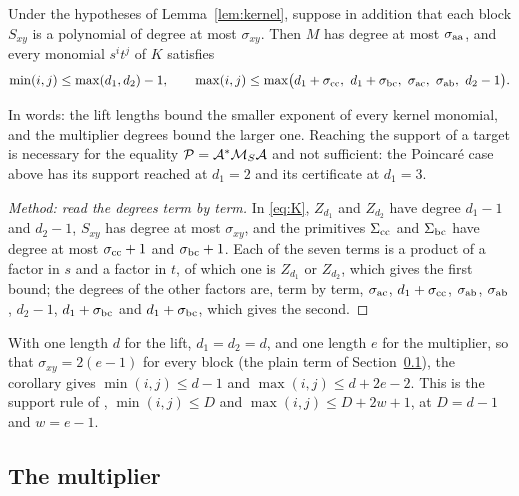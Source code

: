\begin{corollary}\label{cor:support}
Under the hypotheses of Lemma~\ref{lem:kernel}, suppose in addition that each block $S_{xy}$ is a polynomial of degree at most $\sigma_{xy}$. Then $M$ has degree at most $\sigma_{\mathrm{a}\mathrm{a}}$, and every monomial $s^it^j$ of $K$ satisfies
\[
\min(i,j)\le\max(d_1,d_2)-1,\qquad \max(i,j)\le\max\bigl(d_1+\sigma_{\bc\bc},\ d_1+\sigma_{\bb\bc},\ \sigma_{\ba\bc},\ \sigma_{\ba\bb},\ d_2-1\bigr).
\]
\end{corollary}
In words: the lift lengths bound the smaller exponent of every kernel monomial, and the multiplier degrees bound the larger one. Reaching the support of a target is necessary for the equality $\mathcal{P}=\mathcal{A}^*\mathcal{M}_S\mathcal{A}$ and not sufficient: the Poincar\'e case above has its support reached at $d_1=2$ and its certificate at $d_1=3$.

\begin{proof}[Method: read the degrees term by term]
In \eqref{eq:K}, $Z_{d_1}$ and $Z_{d_2}$ have degree $d_1-1$ and $d_2-1$, $S_{xy}$ has degree at most $\sigma_{xy}$, and the primitives $\Sigma_{\mathrm{c}\mathrm{c}}$ and $\Sigma_{\mathrm{b}\mathrm{c}}$ have degree at most $\sigma_{\mathrm{c}\mathrm{c}}+1$ and $\sigma_{\mathrm{b}\mathrm{c}}+1$. Each of the seven terms is a product of a factor in $s$ and a factor in $t$, of which one is $Z_{d_1}$ or $Z_{d_2}$, which gives the first bound; the degrees of the other factors are, term by term, $\sigma_{\mathrm{a}\mathrm{c}}$, $d_1+\sigma_{\mathrm{c}\mathrm{c}}$, $\sigma_{\mathrm{a}\mathrm{b}}$, $\sigma_{\mathrm{a}\mathrm{b}}$, $d_2-1$, $d_1+\sigma_{\mathrm{b}\mathrm{c}}$ and $d_1+\sigma_{\mathrm{b}\mathrm{c}}$, which gives the second.
\end{proof}

With one length $d$ for the lift, $d_1=d_2=d$, and one length $e$ for the multiplier, so that $\sigma_{xy}=2(e-1)$ for every block (the plain term of Section~\ref{sec:mult}), the corollary gives $\min(i,j)\le d-1$ and $\max(i,j)\le d+2e-2$. This is the support rule of , $\min(i,j)\le D$ and $\max(i,j)\le D+2w+1$, at $D=d-1$ and $w=e-1$.

\subsection{The multiplier}\label{sec:mult}

